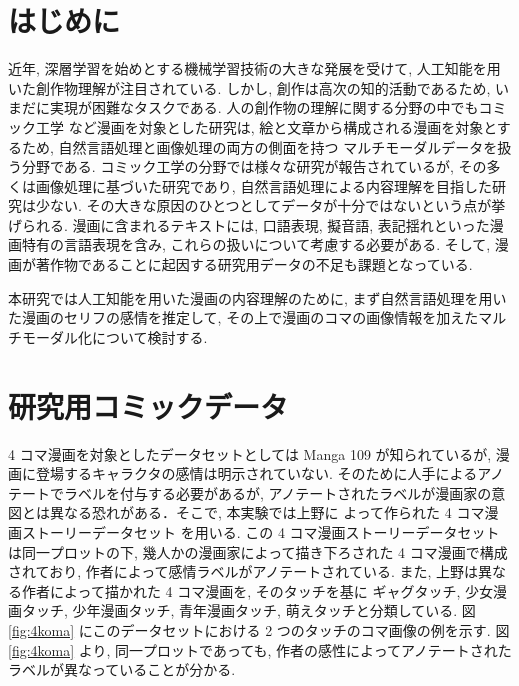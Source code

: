 \documentclass[twocolumn]{jarticle}     %
\begin{document}

\section{はじめに}
近年, 深層学習を始めとする機械学習技術の大きな発展を受けて, 人工知能を用いた創作物理解が注目されている.
しかし, 創作は高次の知的活動であるため, いまだに実現が困難なタスクである.
人の創作物の理解に関する分野の中でもコミック工学 \cite{comic} など漫画を対象とした研究は,
絵と文章から構成される漫画を対象とするため, 自然言語処理と画像処理の両方の側面を持つ
マルチモーダルデータを扱う分野である.
コミック工学の分野では様々な研究が報告されているが,
その多くは画像処理に基づいた研究であり,
自然言語処理による内容理解を目指した研究は少ない.
その大きな原因のひとつとしてデータが十分ではないという点が挙げられる.
漫画に含まれるテキストには, 口語表現, 擬音語, 表記揺れといった漫画特有の言語表現を含み,
これらの扱いについて考慮する必要がある.
そして, 漫画が著作物であることに起因する研究用データの不足も課題となっている.


本研究では人工知能を用いた漫画の内容理解のために,
まず自然言語処理を用いた漫画のセリフの感情を推定して,
その上で漫画のコマの画像情報を加えたマルチモーダル化について検討する.

\section{研究用コミックデータ}
4 コマ漫画を対象としたデータセットとしては Manga 109 \cite{mtap_matsui_2017} が知られているが, 漫画に登場するキャラクタの感情は明示されていない. そのために人手によるアノテートでラベルを付与する必要があるが, アノテートされたラベルが漫画家の意図とは異なる恐れがある．そこで, 本実験では上野に
よって作られた 4 コマ漫画ストーリーデータセット \cite{ueno_miki2018} を用いる. この 4 コマ漫画ストーリーデータセットは同一プロットの下, 幾人かの漫画家によって描き下ろされた 4 コマ漫画で構成されており, 作者によって感情ラベルがアノテートされている.
また, 上野は異なる作者によって描かれた 4 コマ漫画を, そのタッチを基に
ギャグタッチ, 少女漫画タッチ, 少年漫画タッチ, 青年漫画タッチ, 萌えタッチと分類している. 図 \ref{fig:4koma} にこのデータセットにおける 2 つのタッチのコマ画像の例を示す. 図 \ref{fig:4koma} より, 同一プロットであっても, 作者の感性によってアノテートされたラベルが異なっていることが分かる.
\end{document}
